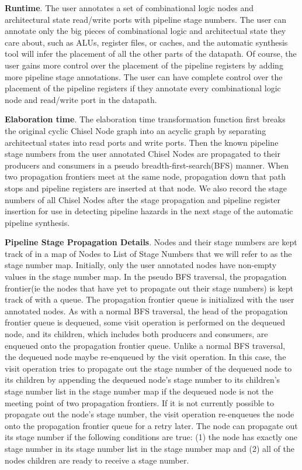 {\bf Runtime}. The user annotates a set of combinational logic nodes
and architectural state read/write ports with pipeline stage
numbers. The user can annotate only the big pieces of combinational
logic and architectual state they care about, such as ALUs, register
files, or caches, and the automatic synthesis tool will infer the
placement of all the other parts of the datapath. Of course, the user
gains more control over the placement of the pipeline registers by
adding more pipeline stage annotations. The user can have complete
control over the placement of the pipeline registers if they annotate
every combinational logic node and read/write port in the datapath. 

{\bf Elaboration time}. The elaboration time transformation function
first breaks the original cyclic Chisel Node graph into an acyclic
graph by separating architectual states into read ports and write
ports. Then the known pipeline stage numbers from the user annotated
Chisel Nodes are propagated to their producers and consumers in a
pseudo breadth-first-search(BFS) manner. When two propagation
frontiers meet at the same node, propagation down that path stops and
pipeline registers are inserted at that node. We also record the stage
numbers of all Chisel Nodes after the stage propagation and pipeline
register insertion for use in detecting pipeline hazards in the next
stage of the automatic pipeline synthesis. 

{\bf Pipeline Stage Propagation Details}. Nodes and their stage
numbers are kept track of in a map of Nodes to List of Stage Numbers
that we will refer to as the stage number map. Initially, only the
user annotated nodes have non-empty values in the stage number map. In
the pseudo BFS traversal, the propagation frontier(ie the nodes that
have yet to propagate out their stage numbers) is kept track of with a
queue. The propagation frontier queue is initialized with the user
annotated nodes. As with a normal BFS traversal, the head of the
propagation frontier queue is dequeued, some visit operation is
performed on the dequeued node, and its children, which includes both
producers and consumers, are enqueued onto the propagation frontier
queue. Unlike a normal BFS traversal, the dequeued node maybe
re-enqueued by the visit operation. In this case, the visit operation
tries to propagate out the stage number of the dequeued node to its
children by appending the dequeued node's stage number to its
children's stage number list in the stage number map if the dequeued
node is not the meeting point of two propagation frontiers. If it is
not currently possible to propagate out the node's stage number, the
visit operation re-enqueues the node onto the propagation frontier
queue for a retry later. The node can propagate out its stage number
if the following conditions are true: (1) the node has exactly one
stage number in its stage number list in the stage number map and (2)
all of the nodes children are ready to receive a stage number.  

